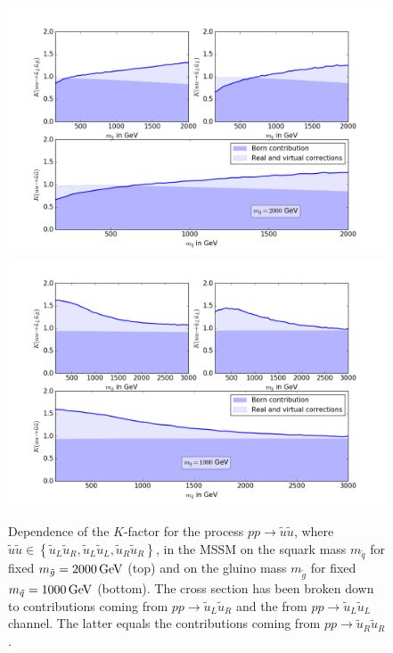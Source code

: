 \begin{figure}[!htpb]
\begin{center}
\includegraphics[scale=.5]{figures/MSSM_uu_susu_Kfactors_msg=2000GeV.png}
\includegraphics[scale=.5]{figures/MSSM_uu_susu_Kfactors_msq=1000GeV.png}
\caption{Dependence of the $K$-factor for the process $pp \to \tilde{u}\tilde{u}$, where $\tilde{u}\tilde{u} \in \left\{ \tilde{u}_L\tilde{u}_R, \tilde{u}_L\tilde{u}_L, \tilde{u}_R\tilde{u}_R \right\}$, in the MSSM on the squark mass $m_{\tilde{q}}$ for fixed $m_{\tilde{g}} = \unit[2000]{GeV}$ (top) and on the gluino mass $m_{\tilde{g}}$ for fixed $m_{\tilde{q}} = \unit[1000]{GeV}$ (bottom). The cross section has been broken down to contributions coming from $pp \to \tilde{u}_L\tilde{u}_R$ and the from $pp \to \tilde{u}_L\tilde{u}_L$ channel. The latter equals the contributions coming from $pp \to \tilde{u}_R\tilde{u}_R$.}\label{fig:1LXsection_fixed_m}
\end{center}
\end{figure}
